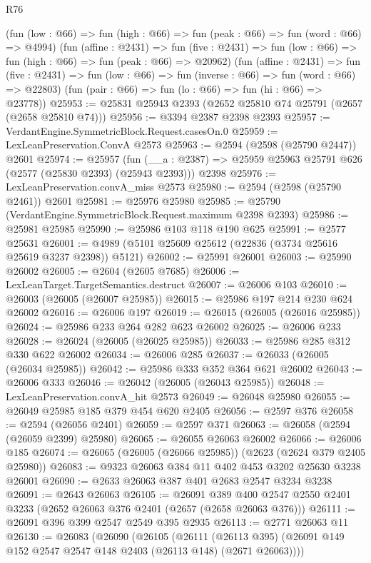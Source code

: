 \begin{lexlean}{R76}
\begin{coremodule}
      (fun (low : @66) => fun (high : @66) => fun (peak : @66) => fun (word : @66) => @4994)
      (fun (affine : @2431) =>
      fun (five : @2431) => fun (low : @66) => fun (high : @66) => fun (peak : @66) => @20962)
      (fun (affine : @2431) =>
      fun (five : @2431) => fun (low : @66) => fun (inverse : @66) => fun (word : @66) => @22803)
      (fun (pair : @66) => fun (lo : @66) => fun (hi : @66) => @23778))
@25953 := @25831 @25943 @2393 (@2652 @25810 @74 @25791 (@2657 (@2658 @25810 @74)))
@25956 := @3394 @2387 @2398 @2393
@25957 := VerdantEngine.SymmetricBlock.Request.casesOn.{0}
@25959 := LexLeanPreservation.ConvA @2573
@25963 := @2594 (@2598 (@25790 @2447)) @2601
@25974 := @25957
    (fun (__a : @2387) => @25959 @25963 @25791 @626 (@2577 (@25830 @2393) (@25943 @2393)))
    @2398
@25976 := LexLeanPreservation.convA_miss @2573
@25980 := @2594 (@2598 (@25790 @2461)) @2601
@25981 := @25976 @25980
@25985 := @25790 (VerdantEngine.SymmetricBlock.Request.maximum @2398 @2393)
@25986 := @25981 @25985
@25990 := @25986 @103 @118 @190 @625
@25991 := @2577 @25631
@26001 := @4989 (@5101 @25609 @25612 (@22836 (@3734 @25616 @25619 @3237 @2398)) @5121)
@26002 := @25991 @26001
@26003 := @25990 @26002
@26005 := @2604 (@2605 @7685)
@26006 := LexLeanTarget.TargetSemantics.destruct
@26007 := @26006 @103
@26010 := @26003 (@26005 (@26007 @25985))
@26015 := @25986 @197 @214 @230 @624 @26002
@26016 := @26006 @197
@26019 := @26015 (@26005 (@26016 @25985))
@26024 := @25986 @233 @264 @282 @623 @26002
@26025 := @26006 @233
@26028 := @26024 (@26005 (@26025 @25985))
@26033 := @25986 @285 @312 @330 @622 @26002
@26034 := @26006 @285
@26037 := @26033 (@26005 (@26034 @25985))
@26042 := @25986 @333 @352 @364 @621 @26002
@26043 := @26006 @333
@26046 := @26042 (@26005 (@26043 @25985))
@26048 := LexLeanPreservation.convA_hit @2573
@26049 := @26048 @25980
@26055 := @26049 @25985 @185 @379 @454 @620 @2405
@26056 := @2597 @376
@26058 := @2594 (@26056 @2401)
@26059 := @2597 @371
@26063 := @26058 (@2594 (@26059 @2399) @25980)
@26065 := @26055 @26063 @26002
@26066 := @26006 @185
@26074 := @26065 (@26005 (@26066 @25985)) (@2623 (@2624 @379 @2405 @25980))
@26083 := @9323 @26063 @384 @11 @402 @453 @3202 @25630 @3238 @26001
@26090 := @2633 @26063 @387 @401 @2683 @2547 @3234 @3238
@26091 := @2643 @26063
@26105 := @26091
    @389
    @400
    @2547
    @2550
    @2401
    @3233
    (@2652 @26063 @376 @2401 (@2657 (@2658 @26063 @376)))
@26111 := @26091 @396 @399 @2547 @2549 @395 @2935
@26113 := @2771 @26063 @11
@26130 := @26083
    (@26090
      (@26105
        (@26111
          (@26113 @395)
          (@26091 @149 @152 @2547 @2547 @148 @2403 (@26113 @148) (@2671 @26063))))

\end{coremodule}
\end{lexlean}
